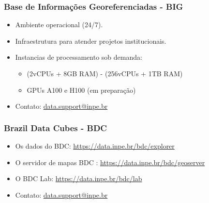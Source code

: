 \documentclass[aspectratio=169]{beamer}
\begin{document}
\begin{frame}
    \frametitle{Base de Informações Georeferenciadas - BIG}
    \begin{itemize}
        \item Ambiente operacional (24/7).
        \item Infraestrutura para atender projetos institucionais.
        \item Instancias de processamento sob demanda:
            \begin{itemize}
                \item (2vCPUs + 8GB RAM) - (256vCPUs + 1TB RAM)
                \item GPUs A100 e H100 (em preparação)
            \end{itemize}
        \item Contato: \href{mailto:[data.support@inpe.br]}{data.support@inpe.br}
    \end{itemize}
\end{frame}

\begin{frame}
    \frametitle{Brazil Data Cubes - BDC}
    \begin{itemize}
        \item Os dados do BDC: \url{https://data.inpe.br/bdc/explorer}
        \item O servidor de mapas BDC : \url{https://data.inpe.br/bdc/geoserver}
        \item O BDC Lab: \url{https://data.inpe.br/bdc/lab}
        \item Contato: \href{mailto:[data.support@inpe.br]}{data.support@inpe.br}
    \end{itemize}
\end{frame}
\end{document}
